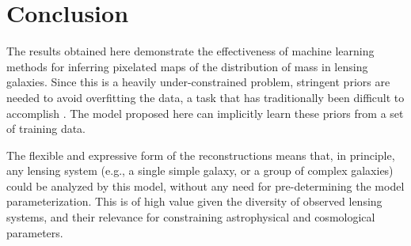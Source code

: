 

\section{Conclusion}\label{sec:conclusion}


The results obtained here demonstrate the effectiveness of machine learning methods for inferring pixelated maps of the distribution of mass in lensing galaxies. Since this is a heavily under-constrained problem, stringent priors are needed to avoid overfitting the data, a task that has traditionally been difficult to accomplish \citep[e.g., ][]{Saha1997}. The model proposed here can implicitly learn these priors from a set of training data. 

The flexible and expressive form of the reconstructions means that, in principle, any lensing system (e.g., a single simple galaxy, or a group of complex galaxies) could be analyzed by this model, without any need for pre-determining the model parameterization. This is of high value given the diversity of observed lensing systems, and their relevance for constraining astrophysical and cosmological parameters. 

